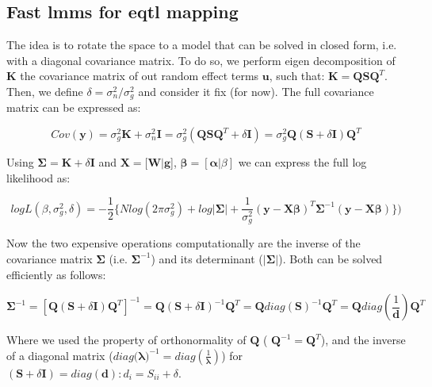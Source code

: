 \subsection{Fast \gls{lmm}s for e\gls{qtl} mapping}

The idea is to rotate the space to a model that can be solved in closed form, i.e. with a diagonal covariance matrix. 
To do so, we perform eigen decomposition of $\mathbf{K}$ the covariance matrix of out random effect terms $\mathbf{u}$, such that: $\mathbf{K} = \mathbf{Q}\mathbf{S}\mathbf{Q}^T$.\\

Then, we define $\delta = \sigma_n^2/\sigma_g^2$ and consider it fix (for now).
The full covariance matrix can be expressed as:

\begin{equation}\label{eq:fast_lmm_full_covariance}
 Cov(\mathbf{y}) = \sigma_g^2\mathbf{K} + \sigma_n^2\mathbf{I} = \sigma_g^2(\mathbf{Q}\mathbf{S}\mathbf{Q}^T + \delta\mathbf{I})= \sigma_g^2\mathbf{Q} (\mathbf{S} + \delta\mathbf{I})\mathbf{Q}^T
\end{equation}

Using $\boldsymbol{\Sigma} = \mathbf{K} + \delta\mathbf{I}$ and $\mathbf{X} = [\mathbf{W} | \mathbf{g}$], $\boldsymbol{\beta} = [\boldsymbol{\alpha} | \beta]$ we can express the full log likelihood as:

\begin{equation} \label{eq:fast_lmm_log_likelihood}
 logL(\beta, \sigma_g^2, \delta) = -\frac{1}{2} \bigg\{Nlog(2\pi\sigma_g^2) + log|\boldsymbol{\Sigma}|+ \frac{1}{\sigma_g^2}(\mathbf{y}-\mathbf{X}\boldsymbol{\beta})^T\boldsymbol{\Sigma}^{-1}(\mathbf{y}-\mathbf{X}\boldsymbol{\beta}) \bigg\}) 
\end{equation}

Now the two expensive operations computationally are the inverse of the covariance matrix $\boldsymbol{\Sigma}$ (i.e. $\boldsymbol{\Sigma}^{-1}$) and its determinant ($|\boldsymbol{\Sigma}|$). 
Both can be solved efficiently as follows:  

\begin{equation}\label{eq:fast_lmm_Sigma_inverse}
    \boldsymbol{\Sigma}^{-1} = [\mathbf{Q} (\mathbf{S} + \delta\mathbf{I})\mathbf{Q}^T]^{-1} = \mathbf{Q} (\mathbf{S} + \delta\mathbf{I})^{-1}\mathbf{Q}^T = \mathbf{Q} diag(\mathbf{S})^{-1}\mathbf{Q}^T = \mathbf{Q} diag(\frac{1}{\mathbf{d}})\mathbf{Q}^T
\end{equation}

Where we used the property of orthonormality of $\mathbf{Q}$ ( $\mathbf{Q}^{-1} = \mathbf{Q}^T$), and the inverse of a diagonal matrix ($diag(\boldsymbol{\lambda)}^{-1} = diag(\frac{1}{\boldsymbol{\lambda}})$) for $(\mathbf{S} + \delta\mathbf{I}) = diag(\mathbf{d}): d_i = S_{ii} + \delta$.

